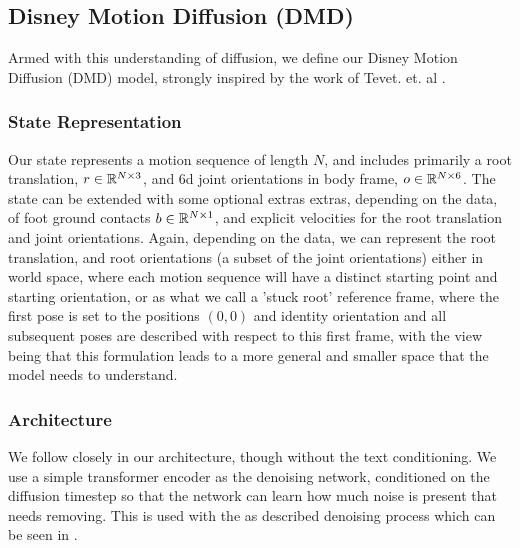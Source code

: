 \subsection{Disney Motion Diffusion (DMD)}
\label{sec:disney_motion_diffusion}
Armed with this understanding of diffusion, we define our Disney Motion Diffusion (DMD) model, strongly inspired by the work of Tevet. et. al \cite{MDM}.



\subsubsection{State Representation}
Our state represents a motion sequence of length $N$, and includes primarily a root translation, $r \in \mathbb{R}^{N \times 3}$, and 6d \cite{aa_6d_angles} joint orientations in body frame, $o \in \mathbb{R}^{N \times 6}$. The state can be extended with some optional extras extras, depending on the data, of foot ground contacts $b \in \mathbb{R}^{N \times 1}$, and explicit velocities for the root translation and joint orientations. Again, depending on the data, we can represent the root translation, and root orientations (a subset of the joint orientations) either in world space, where each motion sequence will have a distinct starting point and starting orientation, or as what we call a 'stuck root' reference frame, where the first pose is set to the positions $(0,0)$ and identity orientation and all subsequent poses are described with respect to this first frame, with the view being that this formulation leads to a more general and smaller space that the model needs to understand.



\subsubsection{Architecture}
We follow closely \cite{MDM} in our architecture, though without the text conditioning. We use a simple transformer \cite{vaswani2017attention} encoder as the denoising network, conditioned on the diffusion timestep so that the network can learn how much noise is present that needs removing. This is used with the as described denoising process which can be seen in .


